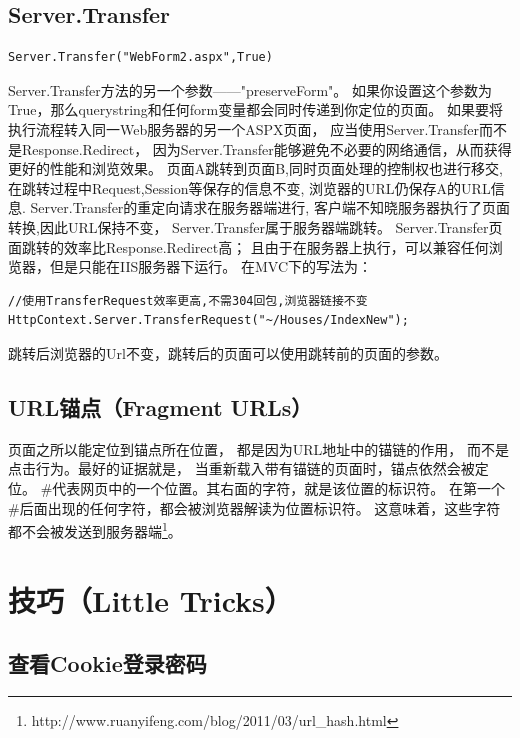 \documentclass{book}
\begin{document}
\subsection{Server.Transfer}

\begin{lstlisting}[language={[Sharp]C}]
Server.Transfer("WebForm2.aspx",True)
\end{lstlisting}

Server.Transfer方法的另一个参数——"preserveForm"。
如果你设置这个参数为True，那么querystring和任何form变量都会同时传递到你定位的页面。
如果要将执行流程转入同一Web服务器的另一个ASPX页面，
应当使用Server.Transfer而不是Response.Redirect，
因为Server.Transfer能够避免不必要的网络通信，从而获得更好的性能和浏览效果。
页面A跳转到页面B,同时页面处理的控制权也进行移交,
在跳转过程中Request,Session等保存的信息不变,
浏览器的URL仍保存A的URL信息.
Server.Transfer的重定向请求在服务器端进行,
客户端不知晓服务器执行了页面转换,因此URL保持不变，
Server.Transfer属于服务器端跳转。
Server.Transfer页面跳转的效率比Response.Redirect高；
且由于在服务器上执行，可以兼容任何浏览器，但是只能在IIS服务器下运行。
在MVC下的写法为：

\begin{lstlisting}[language={[Sharp]C}]
//使用TransferRequest效率更高,不需304回包,浏览器链接不变
HttpContext.Server.TransferRequest("~/Houses/IndexNew");
\end{lstlisting}

跳转后浏览器的Url不变，跳转后的页面可以使用跳转前的页面的参数。

\subsection{URL锚点（Fragment URLs）}

页面之所以能定位到锚点所在位置，
都是因为URL地址中的锚链的作用，
而不是点击行为。最好的证据就是，
当重新载入带有锚链的页面时，锚点依然会被定位。
\#代表网页中的一个位置。其右面的字符，就是该位置的标识符。
在第一个\#后面出现的任何字符，都会被浏览器解读为位置标识符。
这意味着，这些字符都不会被发送到服务器端\footnote{http://www.ruanyifeng.com/blog/2011/03/url\_hash.html}。

\section{技巧（Little Tricks）}

\subsection{查看Cookie登录密码}
\end{document}
